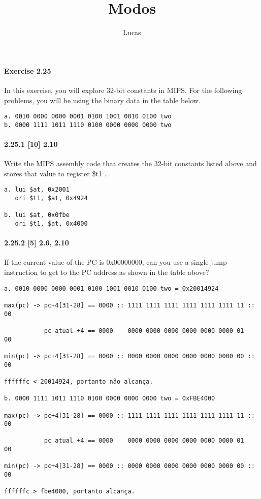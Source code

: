 \documentclass{article}
\author{Lucas}
\title{Modos}
\begin{document}
\maketitle

\paragraph{Exercise 2.25}

In this exercise, you will explore 32-bit constants in MIPS. For the following 
problems, you will be using the binary data in the table below.

\begin{verbatim}
a. 0010 0000 0000 0001 0100 1001 0010 0100 two
b. 0000 1111 1011 1110 0100 0000 0000 0000 two
\end{verbatim}

\paragraph{2.25.1  [10] 2.10} Write the MIPS assembly code that creates the 
32-bit constants listed above and stores that value to register \$t1 .

\begin{verbatim}
a. lui $at, 0x2001
   ori $t1, $at, 0x4924

b. lui $at, 0x0fbe
   ori $t1, $at, 0x4000
\end{verbatim}

\paragraph{2.25.2 [5] 2.6, 2.10} If the current value of the PC is 0x00000000, 
can you use a single jump instruction to get to the PC address as shown in the 
table above?

\begin{verbatim}
a. 0010 0000 0000 0001 0100 1001 0010 0100 two = 0x20014924

max(pc) -> pc+4[31-28] == 0000 :: 1111 1111 1111 1111 1111 1111 11 :: 00

           pc atual +4 == 0000    0000 0000 0000 0000 0000 0000 01    00

min(pc) -> pc+4[31-28] == 0000 :: 0000 0000 0000 0000 0000 0000 00 :: 00

ffffffc < 20014924, portanto não alcança.

b. 0000 1111 1011 1110 0100 0000 0000 0000 two = 0xFBE4000

max(pc) -> pc+4[31-28] == 0000 :: 1111 1111 1111 1111 1111 1111 11 :: 00

           pc atual +4 == 0000    0000 0000 0000 0000 0000 0000 01    00

min(pc) -> pc+4[31-28] == 0000 :: 0000 0000 0000 0000 0000 0000 00 :: 00

ffffffc > fbe4000, portanto alcança.
\end{verbatim}
\end{document}
